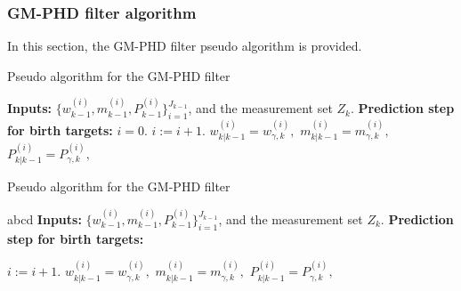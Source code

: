         \subsubsection{GM-PHD filter algorithm}
In this section, the GM-PHD filter pseudo algorithm is provided.
\begin{algorithm}
    \caption{Pseudo algorithm for the GM-PHD filter}
    \begin{algorithmic}[1]
        \State \textbf{Inputs:} $\{w_{k-1}^{(i)}, m_{k-1}^{(i)},P_{k-1}^{(i)}\}_{i=1}^{J_{k-1}}$, and the measurement set $Z_k$.
        \State \textbf{Prediction step for birth targets:}
            \State \quad $i=0.$
        \quad {}
                \State\quad $i:= i+1.$
                \State $w_{k|k-1}^{(i)} = w_{\gamma,k}^{(i)},$ \quad
                        $m_{k|k-1}^{(i)} = m_{\gamma,k}^{(i)},$ \quad
                        $P_{k|k-1}^{(i)} = P_{\gamma,k}^{(i)},$
                \quad\EndFor

    \end{algorithmic}
\end{algorithm}
\algrenewcommand{}
\begin{algorithm}
       \caption{Pseudo algorithm for the GM-PHD filter}
       \begin{algorithmic}[1]
           \State abcd
           \State \textbf{Inputs:} $\{w_{k-1}^{(i)}, m_{k-1}^{(i)},P_{k-1}^{(i)}\}_{i=1}^{J_{k-1}}$, and the measurement set $Z_k$.
           \State \textbf{Prediction step for birth targets:}

              \State $i:= i+1.$
              \State $w_{k|k-1}^{(i)} = w_{\gamma,k}^{(i)},$ \quad
                     $m_{k|k-1}^{(i)} = m_{\gamma,k}^{(i)},$ \quad
                     $P_{k|k-1}^{(i)} = P_{\gamma,k}^{(i)},$
          \EndFor

       \end{algorithmic}
\end{algorithm}

